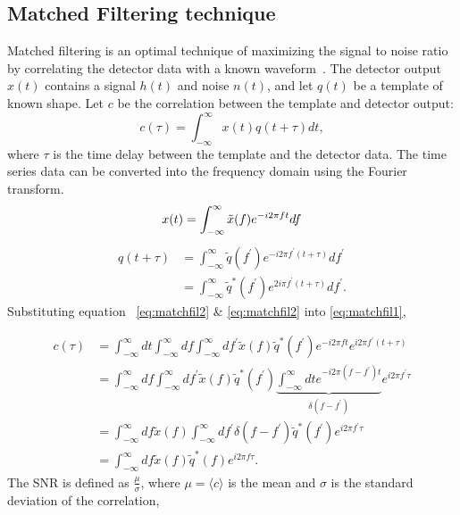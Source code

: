 \documentclass{ttuthes2007}
\begin{document}
\subsection{Matched Filtering technique}
Matched filtering is an optimal technique of maximizing the signal to noise ratio by
correlating the detector data with a known waveform~\cite{Sathyaprakash_2009}.
The detector output $x(t)$ contains a signal $h(t)$ and noise $n(t)$, and let
$q(t)$ be
a template of known shape. Let $c$ be the correlation between the template and
detector output:
\begin{equation}\label{eq:matchfil1}
c(\tau) = \int_{-\infty}^{\infty} x(t)q(t+\tau)dt,
\end{equation}
where $\tau$ is the time delay between the template and the detector data.
The time series data can be converted into the frequency domain using the Fourier
transform. 
\begin{equation}\label{eq:matchfil2}
x(t)=\int_{-\infty}^{\infty} \tilde{x}(f)e^{-i2\pi f t} df\\
\end{equation}
\begin{equation}\label{eq:matchfil3}
\begin{split}
q(t+\tau) &=\int_{-\infty}^{\infty} \tilde{q}(f^{'})e^{-i2\pi f^{'}(t+\tau)}
df^{'}\\
 & =\int_{-\infty}^{\infty} \tilde{q}^{*}(f^{'})e^{2i\pi f^{'}(t+\tau)} df^{'}.
\end{split}
\end{equation}
Substituting equation ~\ref{eq:matchfil2} \& \ref{eq:matchfil2} into \ref{eq:matchfil1},

\begin{align*}
c(\tau) &= \int_{-\infty}^{\infty} dt \int_{-\infty}^{\infty}
df\int_{-\infty}^{\infty} df^{'} \tilde{x}(f)\tilde{q}^*(f^{'}) e^{-i2\pi
ft}e^{i2\pi f^{'}(t+\tau)}\\
  & = \int_{-\infty}^{\infty} df \int_{-\infty}^{\infty} df^{'}
\tilde{x}(f)\tilde{q}^*(f^{'})\underbrace{\int_{-\infty}^{\infty} dt e^{-i 2\pi
(f-f^{'})t}}_{\delta(f-f^{'})}
e^{i 2\pi f^{'}\tau}\\
 & = \int_{-\infty}^{\infty}df\tilde{x}(f)
\int_{-\infty}^{\infty} df^{'}\delta(f-f^{'})\tilde{q}^*(f^{'})e^{i 2\pi
f^{'}\tau}\\
 & = \int_{-\infty}^{\infty}df\tilde{x}(f)\tilde{q}^{*}(f)e^{i 2\pi f\tau}.
\end{align*}
The \ac{SNR} is defined as $\frac{\mu}{\sigma}$, where $\mu=\langle c \rangle$
is the mean and $\sigma$ is the standard deviation of the correlation,
\end{document}
